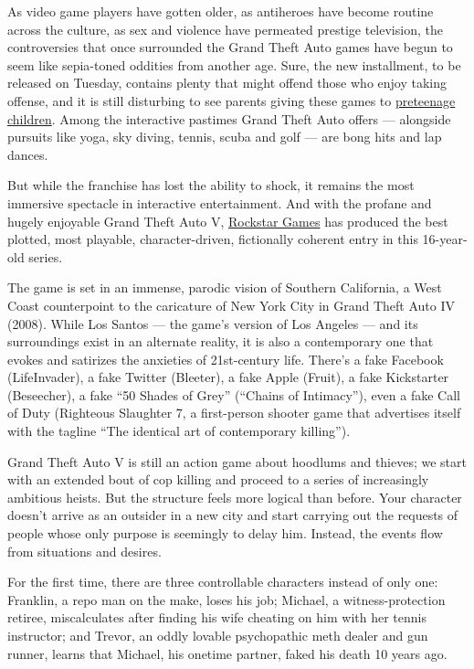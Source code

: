 As video game players have gotten older, as antiheroes have become
routine across the culture, as sex and violence have permeated prestige
television, the controversies that once surrounded the Grand Theft Auto
games have begun to seem like sepia-toned oddities from another age.
Sure, the new installment, to be released on Tuesday, contains plenty
that might offend those who enjoy taking offense, and it is still
disturbing to see parents giving these games to
\href{http://kotaku.com/11-year-old-kid-gets-grand-theft-auto-v-freaks-the-hel-1317048819}{preteenage
children}. Among the interactive pastimes Grand Theft Auto offers ---
alongside pursuits like yoga, sky diving, tennis, scuba and golf --- are
bong hits and lap dances.

But while the franchise has lost the ability to shock, it remains the
most immersive spectacle in interactive entertainment. And with the
profane and hugely enjoyable Grand Theft Auto V,
\href{http://www.rockstargames.com/}{Rockstar Games} has produced the
best plotted, most playable, character-driven, fictionally coherent
entry in this 16-year-old series.

The game is set in an immense, parodic vision of Southern California, a
West Coast counterpoint to the caricature of New York City in Grand
Theft Auto IV (2008). While Los Santos --- the game's version of Los
Angeles --- and its surroundings exist in an alternate reality, it is
also a contemporary one that evokes and satirizes the anxieties of
21st-century life. There's a fake Facebook (LifeInvader), a fake Twitter
(Bleeter), a fake Apple (Fruit), a fake Kickstarter (Beseecher), a fake
``50 Shades of Grey'' (``Chains of Intimacy''), even a fake Call of Duty
(Righteous Slaughter 7, a first-person shooter game that advertises
itself with the tagline ``The identical art of contemporary killing'').

Grand Theft Auto V is still an action game about hoodlums and thieves;
we start with an extended bout of cop killing and proceed to a series of
increasingly ambitious heists. But the structure feels more logical than
before. Your character doesn't arrive as an outsider in a new city and
start carrying out the requests of people whose only purpose is
seemingly to delay him. Instead, the events flow from situations and
desires.

For the first time, there are three controllable characters instead of
only one: Franklin, a repo man on the make, loses his job; Michael, a
witness-protection retiree, miscalculates after finding his wife
cheating on him with her tennis instructor; and Trevor, an oddly lovable
psychopathic meth dealer and gun runner, learns that Michael, his
onetime partner, faked his death 10 years ago.


